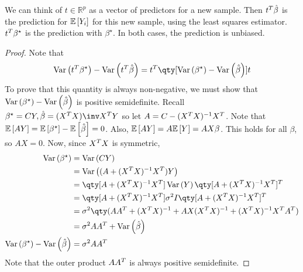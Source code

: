 \begin{remark}
	We can think of $t \in \mathbb R^p$ as a vector of predictors for a new sample.
	Then $t^T \hat \beta$ is the prediction for $\mathbb{E}\left[{Y_i}\right]$ for this new sample, using the least squares estimator.
	$t^T \beta^\star$ is the prediction with $\beta^\star$.
	In both cases, the prediction is unbiased.
\end{remark}

\begin{proof}
	Note that
	\begin{align*}
		\Var{t^\tran \beta^\star} - \Var{t^\tran \hat \beta} = t^\tran \qty[\Var{\beta^\star} - \Var{\hat\beta}] t
	\end{align*}
	To prove that this quantity is always non-negative, we must show that $\operatorname{Var}\left({\beta^\star}\right) - \operatorname{Var}\left({\hat\beta}\right)$ is positive semidefinite.
	Recall $\beta^\star = CY, \hat{\beta} = (X^\tran X)\inv X^\tran Y$ so let $A = C - (X^T X)^{-1} X^T$.
	Note that $\mathbb{E}\left[{AY}\right] = \mathbb{E}\left[{\beta^\star}\right] - \mathbb{E}\left[{\hat\beta}\right] = 0$.
	Also, $\mathbb{E}\left[{AY}\right] = A \mathbb{E}\left[{Y}\right] = AX\beta$.
	This holds for all $\beta$, so $AX = 0$.
	Now, since $X^T X$ is symmetric,
	\begin{align*}
		\Var{\beta^\star}                   & = \Var{CY}                                                                                                                          \\
		                                    & = \Var{(A+(X^\tran X)^{-1} X^\tran)Y}                                                                                     \\
		                                    & = \qty[A+(X^\tran X)^{-1} X^\tran] \Var Y \qty[A+(X^\tran X)^{-1} X^\tran]^\tran                           \\
		                                    & = \qty[A+(X^\tran X)^{-1} X^\tran] \sigma^2 I \qty[A+(X^\tran X)^{-1} X^\tran]^\tran                       \\
		                                    & = \sigma^2 \qty(A A^\tran + (X^\tran X)^{-1} + AX(X^\tran X)^{-1} + (X^\tran X)^{-1} X^\tran A^\tran) \\
		                                    & = \sigma^2 AA^\tran + \Var{\hat \beta}                                                                                         \\
		\Var{\beta^\star} - \Var{\hat\beta} & = \sigma^2 AA^\tran
	\end{align*}
	Note that the outer product $A A^T$ is always positive semidefinite.
\end{proof}

